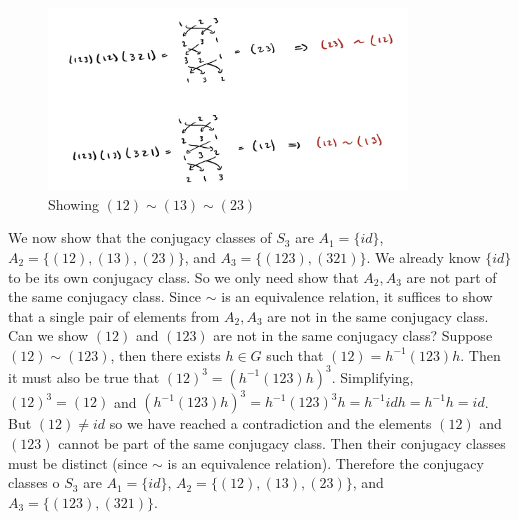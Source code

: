 \documentclass[11pt]{article}
\begin{document}
\begin{exercise}{65}{19}
{        \begin{figure}[h]
            \centering
            \includegraphics[width=0.85\textwidth]{img/12eq}
            \caption{Showing $(12) \sim (13) \sim (23)$}
            \label{fig:12eq}
        \end{figure}

        \newpage
        We now show that the conjugacy classes of $S_3$ are $A_1 = \{ id \}$, $A_2 = \{ (12), (13), (23) \}$, and $A_3 = \{ (123), (321) \}$.
        We already know $\{ id \}$ to be its own conjugacy class.
        So we only need show that $A_2, A_3$ are not part of the same conjugacy class.
        Since $\sim$ is an equivalence relation, it suffices to show that a single pair of elements from $A_2, A_3$ are not in the same conjugacy class.
        Can we show $(12)$ and $(123)$ are not in the same conjugacy class?
        Suppose $(12) \sim (123)$, then there exists $h \in G$ such that $(12) = h^{-1} (123) h$.
        Then it must also be true that $(12)^3 = (h^{-1} (123) h)^3$.
        Simplifying, $(12)^3 = (12)$ and $(h^{-1} (123) h)^3 = h^{-1} (123)^3 h = h^{-1} id h = h^{-1} h = id$.
        But $(12) \neq id$ so we have reached a contradiction and the elements $(12)$ and $(123)$ cannot be part of the same conjugacy class.
        Then their conjugacy classes must be distinct (since $\sim$ is an equivalence relation).
        Therefore the conjugacy classes o $S_3$ are $A_1 = \{ id \}$, $A_2 = \{ (12), (13), (23) \}$, and $A_3 = \{ (123), (321) \}$.
    }
\end{exercise}

\end{document}
